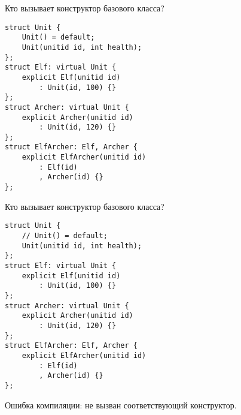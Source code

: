 \documentclass{beamer}
\begin{document}
\begin{frame}[fragile]{Кто вызывает конструктор базового класса?}
\begin{minipage}{.6\textwidth}
    \begin{lstlisting}
struct Unit { 
    Unit() = default;
    Unit(unitid id, int health); 
};
struct Elf: virtual Unit {
    explicit Elf(unitid id) 
        : Unit(id, 100) {}
};
struct Archer: virtual Unit {
    explicit Archer(unitid id) 
        : Unit(id, 120) {}
};
struct ElfArcher: Elf, Archer {
    explicit ElfArcher(unitid id) 
        : Elf(id)
        , Archer(id) {}
};
    \end{lstlisting}
\end{minipage}\hspace{10mm}
\begin{minipage}{.25\textwidth}
\end{minipage}

\end{frame}

\begin{frame}[fragile]{Кто вызывает конструктор базового класса?}
        \begin{lstlisting}
struct Unit { 
    // Unit() = default;
    Unit(unitid id, int health); 
};
struct Elf: virtual Unit {
    explicit Elf(unitid id) 
        : Unit(id, 100) {}
};
struct Archer: virtual Unit {
    explicit Archer(unitid id) 
        : Unit(id, 120) {}
};
struct ElfArcher: Elf, Archer {
    explicit ElfArcher(unitid id) 
        : Elf(id)
        , Archer(id) {}
};
        \end{lstlisting}
    Ошибка компиляции: не вызван соответствующий конструктор.
\end{frame}
\end{document}
